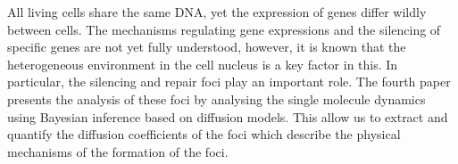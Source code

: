 All living cells share the same DNA, yet the expression of genes differ wildly between cells. The mechanisms regulating gene expressions and the silencing of specific genes are not yet fully understood, however, it is known that the heterogeneous environment in the cell nucleus is a key factor in this. In particular, the silencing and repair foci play an important role. The fourth paper presents the analysis of these foci by analysing the single molecule dynamics using Bayesian inference based on diffusion models. This allow us to extract and quantify the diffusion coefficients of the foci which describe the physical mechanisms of the formation of the foci.